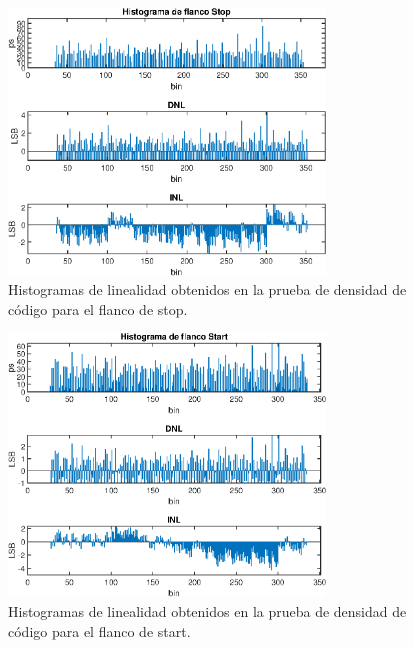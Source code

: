 \begin{figure}[H]
      \centering
      \includegraphics[width=0.75\textwidth]{imagenes/linealidad_stop.eps}
      \caption{Histogramas de linealidad obtenidos en la prueba de densidad de código para el flanco de stop.}
      \label{fig: linealidad_stop}
\end{figure}

\begin{figure}[H]
      \centering
      \includegraphics[width=0.75\textwidth]{imagenes/linealidad_start.eps}
      \caption{Histogramas de linealidad obtenidos en la prueba de densidad de código para el flanco de start.}
      \label{fig: linealidad_start}
\end{figure}

\clearpage

